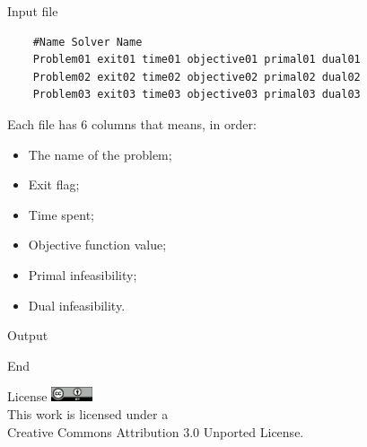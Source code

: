 \documentclass[a0paper,portrait]{baposter}
\begin{document}
\begin{poster}
\begin{posterbox}[column=1]{Input file}
    \begin{lstlisting}
    #Name Solver Name
    Problem01 exit01 time01 objective01 primal01 dual01
    Problem02 exit02 time02 objective02 primal02 dual02
    Problem03 exit03 time03 objective03 primal03 dual03
    \end{lstlisting}

    Each file has 6 columns that means, in order:
    \begin{itemize}
      \item The name of the problem;
      \item Exit flag;
      \item Time spent;
      \item Objective function value;
      \item Primal infeasibility;
      \item Dual infeasibility.
    \end{itemize}
  \end{posterbox}

  \begin{posterbox}[column=1,below=auto]{Output}
    
  \end{posterbox}

  \begin{posterbox}[column=1,below=auto]{End}
    \printbibliography
  \end{posterbox}

  \begin{posterbox}[column=1,below=auto]{License}
    \includegraphics[height=12pt]{figures/cc-by} \\
    This work is licensed under a\\
    Creative Commons Attribution 3.0 Unported License.
  \end{posterbox}
\end{poster}
\end{document}
